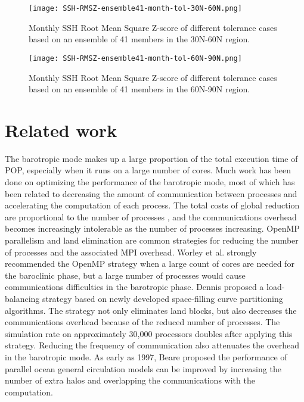 \documentclass{sig-alternate}
\begin{document}
\begin{figure}
\begin{center}
\texttt{[image: SSH-RMSZ-ensemble41-month-tol-30N-60N.png]}
\end{center}
\caption[] {Monthly SSH Root Mean Square Z-score of different tolerance cases based on an ensemble of 41 members in the 30N-60N region.}
\label{fig:ssh_rmsz_30n}
\end{figure}

\begin{figure}
\begin{center}
\texttt{[image: SSH-RMSZ-ensemble41-month-tol-60N-90N.png]}
\end{center}
\caption[] {Monthly SSH Root Mean Square Z-score of different tolerance cases based on an ensemble of 41 members in the 60N-90N region.}
\label{fig:ssh_rmsz_60n}
\end{figure}
\section{Related work} \label{se:rel}
The barotropic mode makes up a large proportion of the total execution time of POP, especially when it runs on a large number of cores. Much work has been done on optimizing the performance of the barotropic mode, most of which has been related to decreasing the amount of communication between processes and accelerating the computation of each process. The total costs of global reduction are proportional to the number of processes , and the communications overhead becomes increasingly intolerable as the number of processes increasing. OpenMP parallelism and land elimination are common strategies for reducing the number of processes and the associated MPI overhead. Worley et al. \cite{Worley:2011:PCE:2063384.2063457} strongly recommended the OpenMP strategy when a large count of cores are needed for the baroclinic phase, but a large number of processes would cause communications difficulties in the barotropic phase.
Dennis \cite{dennis2007inverse,dennis2008scaling} proposed a load-balancing strategy based on newly developed space-filling curve partitioning algorithms. The strategy not only eliminates land blocks, but also decreases the communications overhead because of the reduced number of processes.  The simulation rate on approximately 30,000 processors doubles after applying this strategy. Reducing the frequency of communication also attenuates the overhead in the barotropic mode.
As early as 1997,  Beare \cite{beare1997optimisation} proposed the performance of parallel ocean general circulation models can be improved by increasing the number of extra halos and overlapping the communications with the computation.
\end{document}
